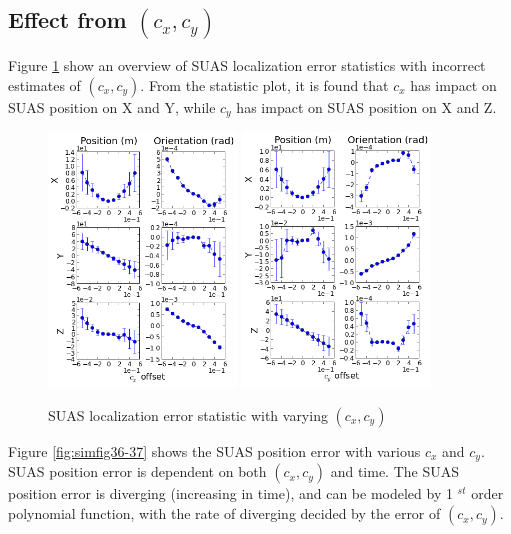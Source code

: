 \subsection{Effect from $(c_{x}, c_{y})$}

Figure \ref{fig:simfig34-35} show an overview of SUAS localization
error statistics with incorrect estimates of $ (c_{x}, c_{y})$. From
the statistic plot, it is found that $c_x$ has impact on SUAS position
on X and Y, while $c_y$ has impact on SUAS position on X and Z. 

\begin{figure}[h]
  \centering
  \includegraphics[width=5cm, keepaspectratio=true]{./Figures/SimulationFigures/Figure34.png}
  \includegraphics[width=5cm, keepaspectratio=true]{./Figures/SimulationFigures/Figure35.png}
  \caption{SUAS localization error statistic with varying $(c_x, c_y)$}
  \label{fig:simfig34-35}
\end{figure}

Figure \ref{fig:simfig36-37} shows the SUAS position error with
various $c_x$ and $c_y$. SUAS position error is dependent on both
$(c_{x}, c_{y})$ and time. The SUAS position error is diverging
(increasing in time), and can be modeled by 1 $^{st}$ order polynomial
function, with the rate of diverging decided by the error of $(c_{x},
c_{y})$. 

